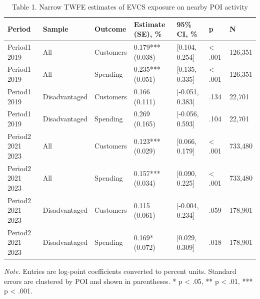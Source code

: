 \begin{table}[!htbp]
\centering
\caption{Table 1. Narrow TWFE estimates of EVCS exposure on nearby POI activity}
\begin{tabular}{lllllll}
\toprule
Period & Sample & Outcome & Estimate (SE), \% & 95\% CI, \% & p & N \\
\midrule
Period1 2019 & All & Customers & 0.179*** (0.038) & [0.104, 0.254] & < .001 & 126,351 \\
Period1 2019 & All & Spending & 0.235*** (0.051) & [0.135, 0.335] & < .001 & 126,351 \\
Period1 2019 & Disadvantaged & Customers & 0.166 (0.111) & [-0.051, 0.383] & .134 & 22,701 \\
Period1 2019 & Disadvantaged & Spending & 0.269 (0.165) & [-0.056, 0.593] & .104 & 22,701 \\
Period2 2021 2023 & All & Customers & 0.123*** (0.029) & [0.066, 0.179] & < .001 & 733,480 \\
Period2 2021 2023 & All & Spending & 0.157*** (0.034) & [0.090, 0.225] & < .001 & 733,480 \\
Period2 2021 2023 & Disadvantaged & Customers & 0.115 (0.061) & [-0.004, 0.234] & .059 & 178,901 \\
Period2 2021 2023 & Disadvantaged & Spending & 0.169* (0.072) & [0.029, 0.309] & .018 & 178,901 \\
\bottomrule
\end{tabular}
\begin{minipage}{0.95\linewidth}\footnotesize\emph{Note.} Entries are log-point coefficients converted to percent units. Standard errors are clustered by POI and shown in parentheses. * p < .05, ** p < .01, *** p < .001.\end{minipage}
\end{table}
